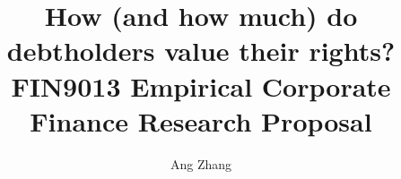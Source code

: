 \documentclass[a4paper, 10pt, authoryear]{elsarticle}
\begin{document}
\title{
    How (and how much) do debtholders value their rights? \\
    \large FIN9013 Empirical Corporate Finance Research Proposal
}
\author{Ang Zhang}


\maketitle
\end{document}

